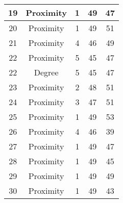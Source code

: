 \documentclass[results.tex]{subfiles}
\begin{document}
\begin{center}
\begin{tabular}{| c || c | c | c | c |}
            \hline
            19                      & Proximity                    & 1                      & 49                      & 47                   \\
            \hline
            20                      & Proximity                    & 1                      & 49                      & 51                   \\
            \hline
            21                      & Proximity                    & 4                      & 46                      & 49                   \\
            \hline
            22                      & Proximity                    & 5                      & 45                      & 47                   \\
            \hline
            22                      & Degree                       & 5                      & 45                      & 47                   \\
            \hline
            23                      & Proximity                    & 2                      & 48                      & 51                   \\
            \hline
            24                      & Proximity                    & 3                      & 47                      & 51                   \\
            \hline
            25                      & Proximity                    & 1                      & 49                      & 53                   \\
            \hline
            26                      & Proximity                    & 4                      & 46                      & 39                   \\
            \hline
            27                      & Proximity                    & 1                      & 49                      & 47                   \\
            \hline
            28                      & Proximity                    & 1                      & 49                      & 45                   \\
            \hline
            29                      & Proximity                    & 1                      & 49                      & 49                   \\
            \hline
            30                      & Proximity                    & 1                      & 49                      & 43                   \\

\end{tabular}
\end{center}
\end{document}
